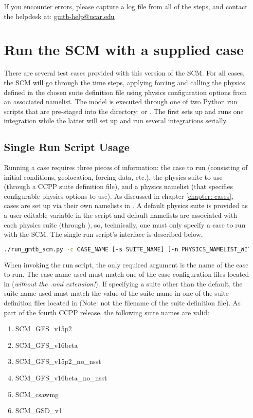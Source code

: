 If you encounter errors, please capture a log file from all of the steps, and contact the helpdesk at: \url{gmtb-help@ucar.edu}

\section{Run the SCM with a supplied case}
There are several test cases provided with this version of the SCM. For all cases, the SCM will go through the time steps, applying forcing and calling the physics defined in the chosen suite definition file using physics configuration options from an associated namelist. The model is executed through one of two Python run scripts that are pre-staged into the  directory:  or . The first sets up and runs one integration while the latter will set up and run several integrations serially. 

\subsection{Single Run Script Usage} \label{subsection: singlerunscript}
Running a case requires three pieces of information: the case to run (consisting of initial conditions, geolocation, forcing data, etc.), the physics suite to use (through a CCPP suite definition file), and a physics namelist (that specifies configurable physics options to use). As discussed in chapter \ref{chapter: cases}, cases are set up via their own namelists in . A default physics suite is provided as a user-editable variable in the script and default namelists are associated with each physics suite (through ), so, technically, one must only specify a case to run with the SCM. The single run script's interface is described below.

\begin{lstlisting}[language=bash]
./run_gmtb_scm.py -c CASE_NAME [-s SUITE_NAME] [-n PHYSICS_NAMELIST_WITH_PATH] [-g] [-d]
\end{lstlisting}

When invoking the run script, the only required argument is the name of the case to run. The case name used must match one of the case configuration files located in  (\emph{without the .nml extension!}). If specifying a suite other than the default, the suite name used must match the value of the suite name in one of the suite definition files located in  (Note: not the filename of the suite definition file). As part of the fourth CCPP release, the following suite names are valid:
\begin{enumerate}
\item SCM\_GFS\_v15p2
\item SCM\_GFS\_v16beta
\item SCM\_GFS\_v15p2\_no\_nsst
\item SCM\_GFS\_v16beta\_no\_nsst
\item SCM\_csawmg
\item SCM\_GSD\_v1
\end{enumerate}

